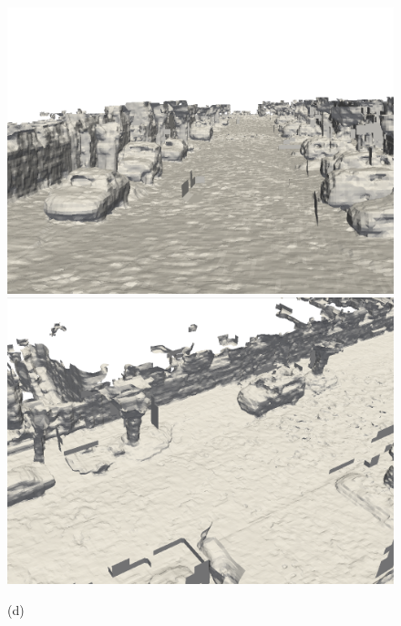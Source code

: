 \begin{figure}[htbp]
\begin{minipage}{0.322\linewidth}
	\end{minipage}\hfill
	\begin{minipage}{0.322\linewidth}
		\centering
		\includegraphics[width=1\linewidth]{figures/kitti_2_shine.png}
	\end{minipage}\hfill
    \begin{minipage}{0.322\linewidth}
		\centering
		\includegraphics[width=1\linewidth]{figures/kitti_3_shine.png}
	\end{minipage}\vfill
    (d)
	\begin{minipage}{0.322\linewidth}
		\centering

\end{minipage}
\end{figure}
